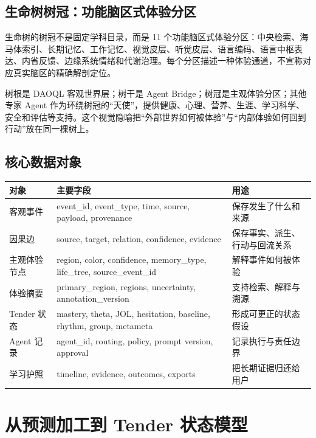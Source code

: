 \documentclass[UTF8,a4paper,11pt]{ctexart}
\begin{document}
\subsection{生命树树冠：功能脑区式体验分区}

生命树的树冠不是固定学科目录，而是 11 个功能脑区式体验分区：中央检索、海马体索引、长期记忆、工作记忆、视觉皮层、听觉皮层、语言编码、语言中枢表达、内省反馈、边缘系统情绪和代谢治理。每个分区描述一种体验通道，不宣称对应真实脑区的精确解剖定位。

树根是 DAOQL 客观世界层；树干是 Agent Bridge；树冠是主观体验分区；其他专家 Agent 作为环绕树冠的“天使”，提供健康、心理、营养、生涯、学习科学、安全和评估等支持。这个视觉隐喻把“外部世界如何被体验”与“内部体验如何回到行动”放在同一棵树上。

\subsection{核心数据对象}

\begin{center}
\begin{longtable}{@{}p{3.6cm}p{5.0cm}p{5.9cm}@{}}
\toprule
\textbf{对象} & \textbf{主要字段} & \textbf{用途} \\
\midrule
客观事件 & event\_id, event\_type, time, source, payload, provenance & 保存发生了什么和来源 \\
因果边 & source, target, relation, confidence, evidence & 保存事实、派生、行动与回流关系 \\
主观体验节点 & region, color, confidence, memory\_type, life\_tree, source\_event\_id & 解释事件如何被体验 \\
体验摘要 & primary\_region, regions, uncertainty, annotation\_version & 支持检索、解释与溯源 \\
Tender 状态 & mastery, theta, JOL, hesitation, baseline, rhythm, group, metameta & 形成可更正的状态假设 \\
Agent 记录 & agent\_id, routing, policy, prompt version, approval & 记录执行与责任边界 \\
学习护照 & timeline, evidence, outcomes, exports & 把长期证据归还给用户 \\
\bottomrule
\end{longtable}
\end{center}

\newpage
\section{从预测加工到 Tender 状态模型}
\end{document}
